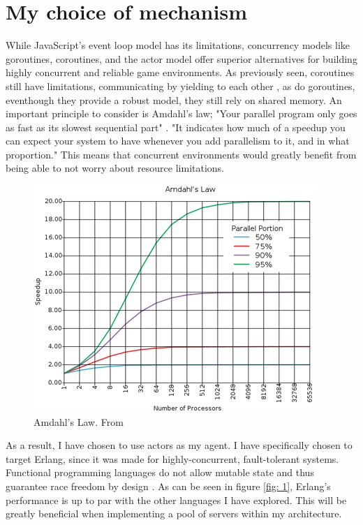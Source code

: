 \documentclass[]{final}
\begin{document}
\section{My choice of mechanism}
While JavaScript’s event loop model has its limitations, concurrency
models like goroutines, coroutines, and the actor model offer superior
alternatives for building highly concurrent and reliable game environments.
As previously seen, coroutines still have limitations, communicating by yielding
to each other \cite{noauthor_introconcurrency_nodate}, as do goroutines,
eventhough they provide a robust model, they still rely on shared memory.
An important principle to consider is Amdahl's law; "Your parallel program only goes as fast as its slowest sequential part" \cite{yang_c_nodate}.
"It indicates how much of a speedup you can expect your system to have whenever
you add parallelism to it, and in what proportion." \cite{yang_c_nodate}
This means that concurrent environments would greatly benefit from being able to
not worry about resource limitations.
\begin{figure}[ht!]
  \centering
  \includegraphics[width=0.7\linewidth]{amdahl}
  \vspace*{-0.3cm}
  \caption{Amdahl's Law. From \cite{noauthor_hitchhikers_nodate}}
  \label{fig: 0}
\end{figure}

\newpage

As a result, I have chosen to use actors as my agent. I have specifically
chosen to target Erlang, since it was made for highly-concurrent, fault-tolerant
systems. Functional programming languages do not allow mutable state and thus
guarantee race freedom by design \cite{bianchi_survey_2018}.
As can be seen in figure \ref{fig: 1}, Erlang's performance is up to par with the
other languages I have explored. This will be greatly beneficial when implementing
a pool of servers within my architecture.
\end{document}
